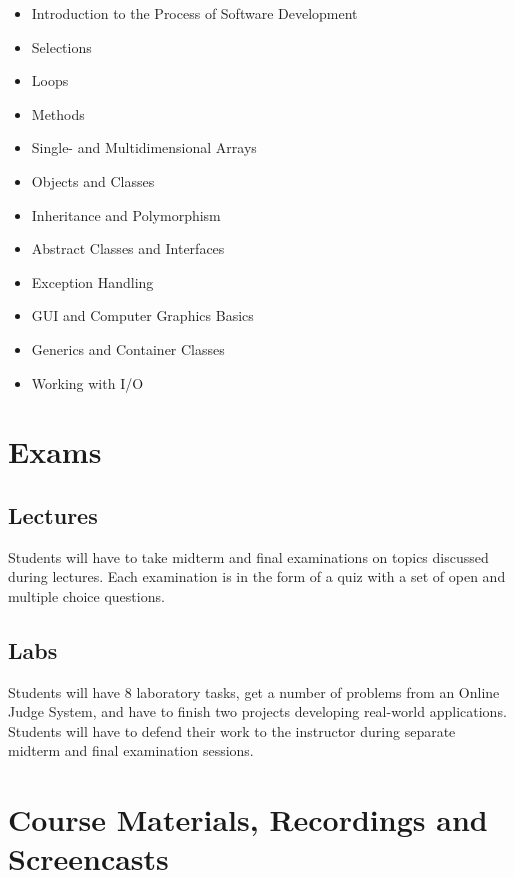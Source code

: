 \documentclass[12pt,a4paper,oneside]{article}
\begin{document}
        \begin{itemize}
            \item Introduction to the Process of Software Development
            \item Selections
            \item Loops
            \item Methods
            \item Single- and Multidimensional Arrays
            \item Objects and Classes
            \item Inheritance and Polymorphism
            \item Abstract Classes and Interfaces
            \item Exception Handling
            \item GUI and Computer Graphics Basics
            \item Generics and Container Classes
            \item Working with I/O
        \end{itemize}

    \section{Exams}

        \subsection{Lectures}

            Students will have to take midterm and final examinations on topics
            discussed during lectures. Each examination is in the form of a quiz
            with a set of open and multiple choice questions.

        \subsection{Labs}

            Students will have 8 laboratory tasks, get a number of problems from
            an Online Judge System, and have to finish two projects developing
            real-world applications. Students will have to defend their work to
            the instructor during separate midterm and final examination
            sessions.

    \section{Course Materials, Recordings and Screencasts}
\end{document}
